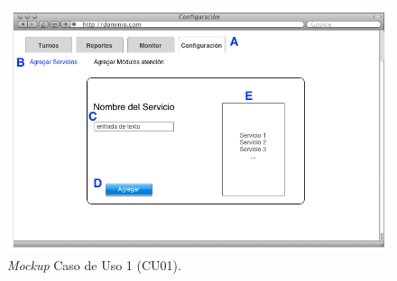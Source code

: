 \begin{figure}[H]
\centering
\includegraphics[scale=0.55]{images/capitulo4/mockupCU01.png}
\caption{\textit{Mockup} Caso de Uso 1 (CU01).}
\label{mockupCU01}
\end{figure}


